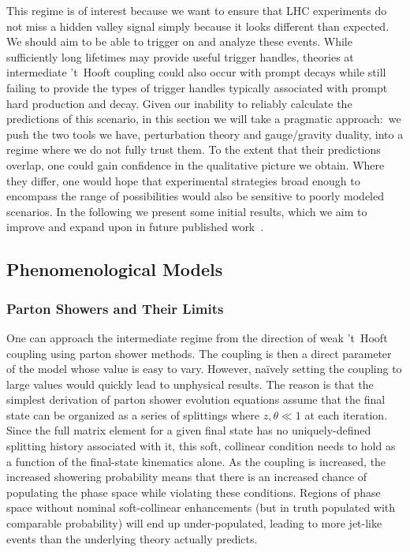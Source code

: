 This regime is of interest because we want to ensure that LHC experiments do not miss a hidden valley signal simply because it looks different than expected. We should aim to be able to trigger on and analyze these events. While sufficiently long lifetimes may provide useful trigger handles, theories at intermediate 't~Hooft coupling could also occur with prompt decays while still failing to provide the types of trigger handles typically associated with prompt hard production and decay. Given our inability to reliably calculate the predictions of this scenario, in this section we will take a pragmatic approach:~we push the two tools we have, perturbation theory and gauge/gravity duality, into a regime where we do not fully trust them. To the extent that their predictions overlap, one could gain confidence in the qualitative picture we obtain. Where they differ, one would hope that experimental strategies broad enough to encompass the range of possibilities would also be sensitive to poorly modeled scenarios. In the following we present some initial results, which we aim to improve and expand upon in future published work~\cite{showersinprogress}.

\subsection{Phenomenological Models}

\subsubsection{Parton Showers and Their Limits}

One can approach the intermediate regime from the direction of weak 't~Hooft coupling using parton shower methods. The coupling is then a direct parameter of the model whose value is easy to vary. However, na\"ively setting the coupling to large values would quickly lead to unphysical results. The reason is that the simplest derivation of parton shower evolution equations assume that the final state can be organized as a series of splittings where $z, \theta \ll 1$ at each iteration. Since the full matrix element for a given final state has no uniquely-defined splitting history associated with it, this soft, collinear condition needs to hold as a function of the final-state kinematics alone. As the coupling is increased, the increased showering probability means that there is an increased chance of populating the phase space while violating these conditions. Regions of phase space without nominal soft-collinear enhancements (but in truth populated with comparable probability) will end up under-populated, leading to more jet-like events than the underlying theory actually predicts.

